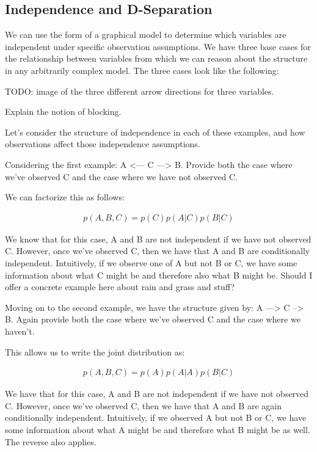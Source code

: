 \subsection{Independence and D-Separation}
We can use the form of a graphical model to determine which variables are independent under specific observation assumptions. We have three base cases for the relationship between variables from which we can reason about the structure in any arbitrarily complex model. The three cases look like the following:

TODO: image of the three different arrow directions for three variables.

Explain the notion of blocking.

Let's consider the structure of independence in each of these examples, and how observations affect those independence assumptions.

Considering the first example: A <--- C ---> B. Provide both the case where we've observed C and the case where we have not observed C.

We can factorize this as follows:

\begin{align*}
	p(A, B, C) = p(C) p(A | C) p(B | C)
\end{align*}

We know that for this case, A and B are not independent if we have not observed C. However, once we've observed C, then we have that A and B are conditionally independent. Intuitively, if we observe one of A but not B or C, we have some information about what C might be and therefore also what B might be. Should I offer a concrete example here about rain and grass and stuff?

Moving on to the second example, we have the structure given by: A ---> C --> B. Again provide both the case where we've observed C and the case where we haven't.

This allows us to write the joint distribution as:

\begin{align*}
	p(A, B, C) = p(A) p(A | A) p(B | C)
\end{align*}

We have that for this case, A and B are not independent if we have not observed C. However, once we've observed C, then we have that A and B are again conditionally independent. Intuitively, if we observed A but not B or C, we have some information about what A might be and therefore what B might be as well. The reverse also applies.

